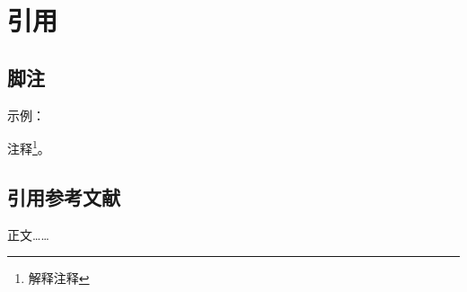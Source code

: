%
%
%


\chapter{引用}

\section{脚注}

示例：

注释\footnote{解释注释}。

\section{引用参考文献}

正文……\cite{yuFeiJiZongTiDuoXueKeSheJiYouHuaDeXianZhuangYuFaZhanFangXiang2008}

